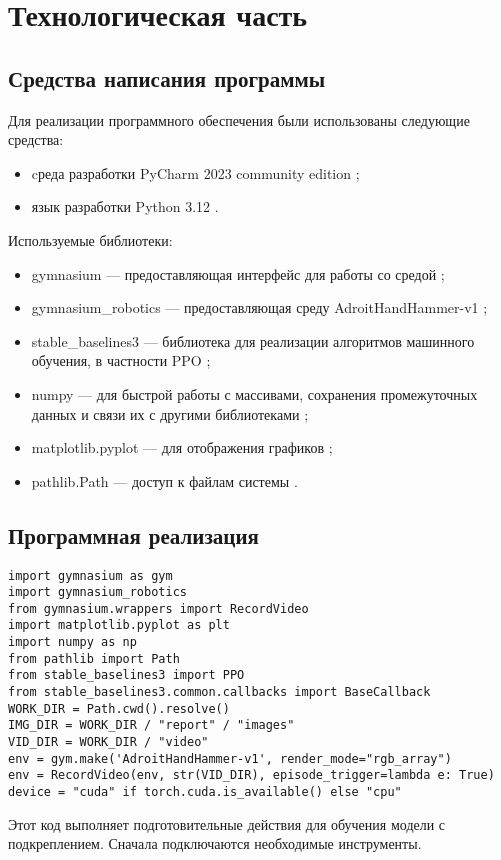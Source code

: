 \chapter{Технологическая часть}

\section{Средства написания программы}
Для реализации программного обеспечения были использованы следующие средства:

\begin{itemize}
    \item cреда разработки PyCharm 2023 community edition \cite{lib:pycharm};
    \item язык разработки Python 3.12 \cite{lib:python}.
\end{itemize}
	
Используемые библиотеки:
\begin{itemize}
    \item gymnasium — предоставляющая интерфейс для работы со средой \cite{lib:gymnasium};
    \item gymnasium\_robotics — предоставляющая среду AdroitHandHammer-v1 \cite{lib:gymnasium_robotics};
    \item stable\_baselines3 — библиотека для реализации алгоритмов машинного обучения, в частности PPO \cite{lib:stable_baselines3};
    \item numpy — для быстрой работы с массивами, сохранения промежуточных данных и связи их с другими библиотеками \cite{lib:numpy};
    \item matplotlib.pyplot — для отображения графиков \cite{lib:matplotlib};
    \item pathlib.Path — доступ к файлам системы \cite{lib:pathlib}.
\end{itemize}

\section{Программная реализация}

\begin{lstlisting}[label=init, caption={Инициализация}]
import gymnasium as gym
import gymnasium_robotics
from gymnasium.wrappers import RecordVideo
import matplotlib.pyplot as plt
import numpy as np
from pathlib import Path
from stable_baselines3 import PPO
from stable_baselines3.common.callbacks import BaseCallback
WORK_DIR = Path.cwd().resolve()
IMG_DIR = WORK_DIR / "report" / "images"
VID_DIR = WORK_DIR / "video"
env = gym.make('AdroitHandHammer-v1', render_mode="rgb_array")
env = RecordVideo(env, str(VID_DIR), episode_trigger=lambda e: True)
device = "cuda" if torch.cuda.is_available() else "cpu"
\end{lstlisting}
Этот код выполняет подготовительные действия для обучения модели с подкреплением. 
Сначала подключаются необходимые инструменты.

